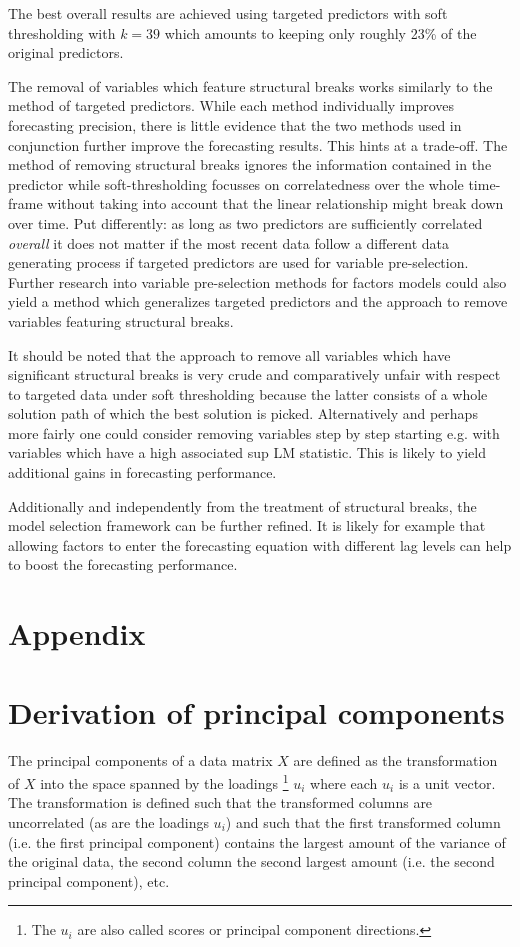 \documentclass[12pt]{article}
\begin{document}
The best overall results are achieved using targeted predictors with soft thresholding with $k=39$ which amounts to keeping only roughly 23\% of the original predictors.

The removal of variables which feature structural breaks works similarly to the method of targeted predictors. While each method individually improves forecasting precision, there is little evidence that the two methods used in conjunction further improve the forecasting results. This hints at a trade-off. The method of removing structural breaks ignores the information contained in the predictor while soft-thresholding focusses on correlatedness over the whole time-frame without taking into account that the linear relationship might break down over time. Put differently: as long as two predictors are sufficiently correlated \textit{overall} it does not matter if the most recent data follow a different data generating process if targeted predictors are used for variable pre-selection. Further research into variable pre-selection methods for factors models could also yield a method which generalizes targeted predictors and the approach to remove variables featuring structural breaks.

It should be noted that the approach to remove all variables which have significant structural breaks is very crude and comparatively unfair with respect to targeted data under soft thresholding because the latter consists of a whole solution path of which the best solution is picked. Alternatively and perhaps more fairly one could consider removing variables step by step starting e.g. with variables which have a high associated sup LM statistic. This is likely to yield additional gains in forecasting performance.

Additionally and independently from the treatment of structural breaks, the model selection framework can be further refined. It is likely for example that allowing factors to enter the forecasting equation with different lag levels can help to boost the forecasting performance.


\clearpage
\newpage
\appendix
\section*{Appendix}

\section{Derivation of principal components}
\label{Derivation of Principal Components}
The principal components of a data matrix $X$ are defined as the transformation of $X$ into the space spanned by the loadings \footnote{The $u_i$ are also called scores or principal component directions.} $u_i$ where each $u_i$ is a unit vector. The transformation is defined such that the transformed columns are uncorrelated (as are the loadings $u_i$) and such that the first transformed column (i.e. the first principal component) contains the largest amount of the variance of the original data, the second column the second largest amount (i.e. the second principal component), etc. \\
\end{document}
